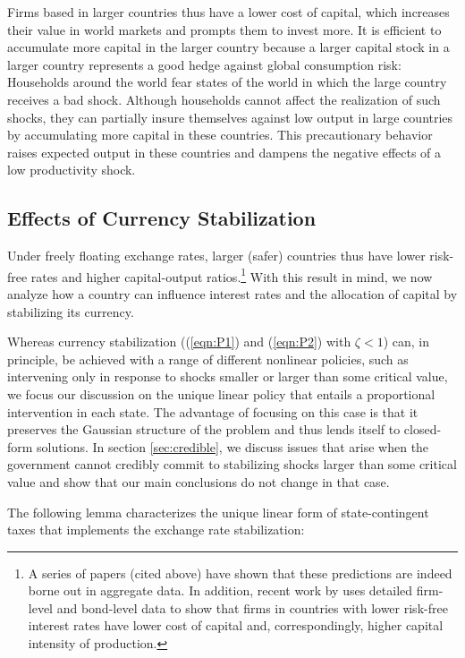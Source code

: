 \documentclass[12pt,letter]{article}
\theoremstyle{break} \theorembodyfont{\normalfont\itshape}
\theoremstyle{break}
\theoremstyle{break} \theorembodyfont{\normalfont\itshape}
\theoremstyle{break} \theorembodyfont{\normalfont\itshape}
\begin{document}
Firms based in larger countries thus have a lower cost of capital,
which increases their value in world markets and prompts them to
invest more. It is efficient to accumulate more capital in the larger
country because a larger capital stock in a larger country represents
a good hedge against global consumption risk: Households around the
world fear states of the world in which the large country receives a
bad shock. Although households cannot affect the realization of such
shocks, they can partially insure themselves against low output in
large countries by accumulating more capital in these countries. This
precautionary behavior raises expected output in these countries and
dampens the negative effects of a low productivity shock.

\subsection{Effects of Currency Stabilization
  \label{sec:positive_effects}}

Under freely floating exchange rates, larger (safer) countries thus
have lower risk-free rates and higher capital-output
ratios.\footnote{A series of papers (cited above) have shown that
  these predictions are indeed borne out in aggregate data. In
  addition, recent work by \cite{Richers2019} uses detailed firm-level
  and bond-level data to show that firms in countries with lower
  risk-free interest rates have lower cost of capital and,
  correspondingly, higher capital intensity of production. } With this
result in mind, we now analyze how a country can influence interest
rates and the allocation of capital by stabilizing its currency.

Whereas currency stabilization ((\ref{eqn:P1}) and (\ref{eqn:P2}) with
\(\zeta<1\)) can, in principle, be achieved with a range of different
nonlinear policies, such as intervening only in response to shocks
smaller or larger than some critical value, we focus our discussion on
the unique linear policy that entails a proportional intervention in
each state. The advantage of focusing on this case is that it
preserves the Gaussian structure of the problem and thus lends itself
to closed-form solutions. In section \ref{sec:credible}, we discuss
issues that arise when the government cannot credibly commit to
stabilizing shocks larger than some critical value and show that our
main conclusions do not change in that case.

The following lemma characterizes the unique linear form of
state-contingent taxes that implements the exchange rate
stabilization:
\end{document}
